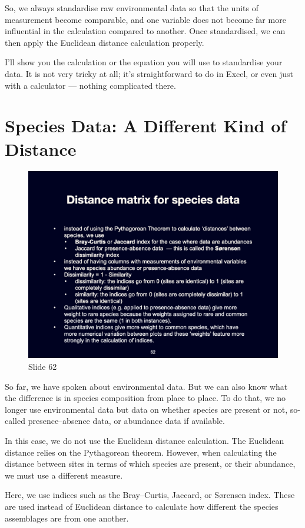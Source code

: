 \documentclass[
  10pt,
]{book}
\begin{document}
So, we always standardise raw environmental data so that the units of
measurement become comparable, and one variable does not become far more
influential in the calculation compared to another. Once standardised,
we can then apply the Euclidean distance calculation properly.

I'll show you the calculation or the equation you will use to
standardise your data. It is not very tricky at all; it's
straightforward to do in Excel, or even just with a calculator ---
nothing complicated there.

\section{Species Data: A Different Kind of
Distance}\label{species-data-a-different-kind-of-distance}

\begin{figure}[ht]
\centering
\includegraphics[width=0.8\linewidth]{../images/BDC334/BDC334-062.jpeg}
\caption*{Slide 62}
\end{figure}

So far, we have spoken about environmental data. But we can also know
what the difference is in species composition from place to place. To do
that, we no longer use environmental data but data on whether species
are present or not, so-called presence--absence data, or abundance data
if available.

In this case, we do not use the Euclidean distance calculation. The
Euclidean distance relies on the Pythagorean theorem. However, when
calculating the distance between sites in terms of which species are
present, or their abundance, we must use a different measure.

Here, we use indices such as the Bray--Curtis, Jaccard, or Sørensen
index. These are used instead of Euclidean distance to calculate how
different the species assemblages are from one another.
\end{document}
